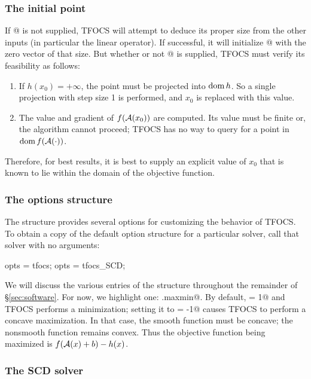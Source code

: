 \documentclass{article}
\begin{document}
\subsubsection{The initial point}

If @ is not supplied, TFOCS will attempt to deduce its
proper size from the other inputs (in particular the linear operator).
If successful, it will initialize @ with the zero vector of
that size. But whether or not @ is supplied, TFOCS must
verify its feasibility as follows:
\begin{enumerate}
\item If $h(x_0)=+\infty$,
the point must be projected into $\operatorname{\textrm{dom}} h$. So a single projection
with step size 1 is performed, and $x_0$ is replaced with this value.
\item The value and gradient of $f(\mathcal{A}(x_0))$ are computed. Its value
must be finite or, the algorithm cannot proceed; TFOCS
has no way to query for a point in $\operatorname{\textrm{dom}} f(\mathcal{A}(\cdot))$.
\end{enumerate}
Therefore, for best results, it is best to supply an explicit value
of $x_0$ that is known to lie within the domain of the objective function.

\subsubsection{The options structure}

The \verb@opts@ structure provides several options for customizing
the behavior of TFOCS. To obtain a copy of the default option structure
for a particular solver, call that solver with no arguments:
\begin{code}
	opts = tfocs;
	opts = tfocs_SCD;
\end{code}
We will discuss the various entries of the \verb@opts@ structure
throughout the remainder of \S\ref{sec:software}. For now,
we highlight one: \verb@opts.maxmin@. By default, \verb@maxmin = 1@
and TFOCS performs a minimization; setting it to \verb@maxmin = -1@
causes TFOCS to perform a concave maximization. In that case,
the smooth function \verb@smoothF@ must be concave; the nonsmooth
function \verb@nonsmoothF@ remains convex. Thus the objective 
function being maximized is $f(\mathcal{A}(x)+b)-h(x)$.

\subsubsection{The SCD solver}
\end{document}
